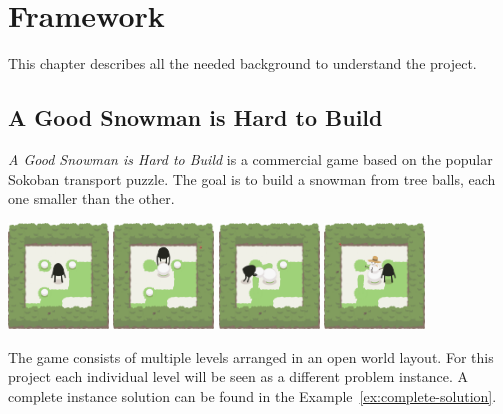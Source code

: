 \documentclass{report}
\theoremstyle{plain}
\begin{document}
\chapter{Framework}
This chapter describes all the needed background to understand the project.

\section{A Good Snowman is Hard to Build}
\emph{A Good Snowman is Hard to Build} is a commercial game based on the popular Sokoban transport puzzle. The goal is to build a snowman from tree balls, each one smaller than the other. 

\begin{center}
\includegraphics[width=0.2\textwidth]{andy-1.png}
\includegraphics[width=0.2\textwidth]{andy-2.png}
\includegraphics[width=0.2\textwidth]{andy-3.png}
\includegraphics[width=0.2\textwidth]{andy-4.png}
\end{center}

The game consists of multiple levels arranged in an open world layout. For this project each individual level will be seen as a different problem instance. A complete instance solution can be found in the Example~\ref{ex:complete-solution}.
\end{document}
